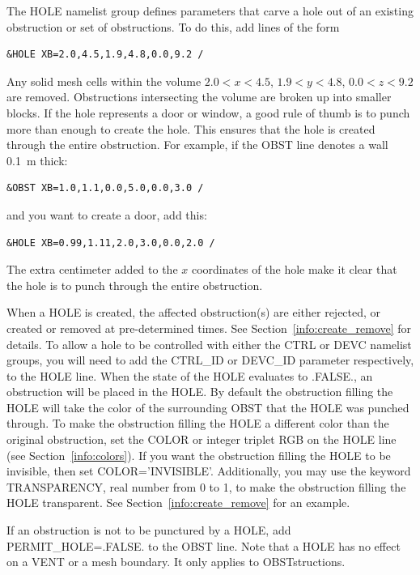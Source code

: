 \documentclass[11pt]{book}
\begin{document}
The {\ct HOLE} namelist group defines parameters that carve a hole out of an existing obstruction or set of obstructions. To do this, add lines of the form
\begin{lstlisting}
&HOLE XB=2.0,4.5,1.9,4.8,0.0,9.2 /
\end{lstlisting}
Any solid mesh cells within the volume $2.0<x<4.5$, $1.9<y<4.8$, $0.0<z<9.2$ are removed. Obstructions intersecting the volume are broken up into smaller blocks. If the hole represents a door or window, a good rule of thumb is to punch more than enough to create the hole. This ensures that the hole is created through the entire obstruction. For example, if the {\ct OBST} line denotes a wall 0.1~m thick:
\begin{lstlisting}
&OBST XB=1.0,1.1,0.0,5.0,0.0,3.0 /
\end{lstlisting}
and you want to create a door, add this:
\begin{lstlisting}
&HOLE XB=0.99,1.11,2.0,3.0,0.0,2.0 /
\end{lstlisting}
The extra centimeter added to the $x$ coordinates of the hole make it clear that the hole is to punch through the entire obstruction.

When a {\ct HOLE} is created, the affected obstruction(s) are either rejected, or created or removed at pre-determined times. See Section~\ref{info:create_remove} for details. To allow a hole to be controlled with either the {\ct CTRL} or {\ct DEVC} namelist groups, you will need to add the {\ct CTRL\_ID} or {\ct DEVC\_ID} parameter respectively, to the {\ct HOLE} line.  When the state of the {\ct HOLE} evaluates to {\ct .FALSE.}, an obstruction will be placed in the {\ct HOLE}.  By default the obstruction filling the {\ct HOLE} will take the color of the surrounding {\ct OBST} that the {\ct HOLE} was punched through.  To make the obstruction filling the {\ct HOLE} a different color than the original obstruction, set the {\ct COLOR} or integer triplet {\ct RGB} on the {\ct HOLE} line (see Section~\ref{info:colors}). If you want the obstruction filling the {\ct HOLE} to be invisible, then set {\ct COLOR='INVISIBLE'}.  Additionally, you may use the keyword {\ct TRANSPARENCY}, real number from 0 to 1, to make the obstruction filling the {\ct HOLE} transparent. See Section~\ref{info:create_remove} for an example.

If an obstruction is not to be punctured by a {\ct HOLE}, add {\ct PERMIT\_HOLE=.FALSE.} to the {\ct OBST} line. Note that a {\ct HOLE} has no effect on a {\ct VENT} or a mesh boundary. It only applies to {\ct OBST}structions.
\end{document}
